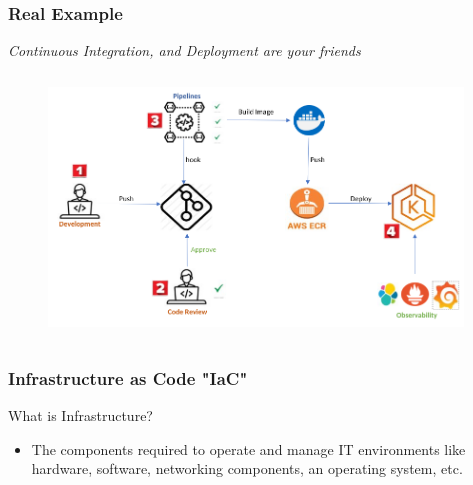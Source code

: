 \documentclass{beamer}
\begin{document}
		\begin{frame}
			\frametitle{Real Example}
			\textit{Continuous Integration, and Deployment are your friends}
			
			\vspace{1mm}
			
			\begin{figure}[h]
				\includegraphics[width=110mm, height=70mm, scale=1]{img/all-in-one.png}
			\end{figure}\vspace{1mm}
			
		\end{frame}
	
	\begin{frame}
		\frametitle{Infrastructure as Code \textbf{"IaC"}}
		What is Infrastructure?
		\begin{itemize}
			\item<2->[] \scriptsize{The components required to operate and manage IT environments like  hardware, software, networking components, an operating system, etc.}
		\end{itemize}
	\vspace{100mm}
	\end{frame}
\end{document}

